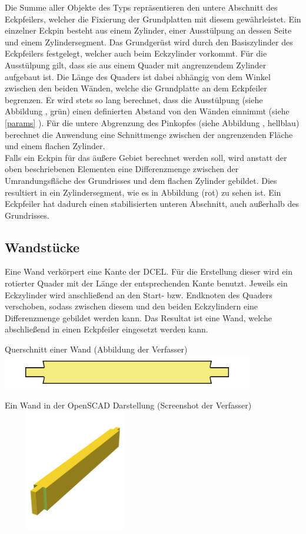 Die Summe aller Objekte des Typs  repräsentieren den untere Abschnitt des Eckpfeilers, welcher die Fixierung der Grundplatten mit diesem gewährleistet.
Ein einzelner Eckpin besteht aus einem Zylinder, einer Ausstülpung an dessen Seite und einem Zylindersegment.
Das Grundgerüst wird durch den Basiszylinder des Eckpfeilers festgelegt, welcher auch beim Eckzylinder vorkommt.
Für die Ausstülpung gilt, dass sie aus einem Quader mit angrenzendem Zylinder aufgebaut ist.
Die Länge des Quaders ist dabei abhängig von dem Winkel zwischen den beiden Wänden, welche die Grundplatte an dem Eckpfeiler begrenzen.
Er wird stets so lang berechnet, dass die Ausstülpung (siehe Abbildung \thebildnr, grün) einen definierten Abstand von den Wänden einnimmt (siehe \ref{params} ).
Für die untere Abgrenzung des Pinkopfes (siehe Abbildung \thebildnr, hellblau) berechnet die Anwendung eine Schnittmenge zwischen der angrenzenden Fläche und einem flachen Zylinder.\\
Falls ein Eckpin für das äußere Gebiet berechnet werden soll, wird anstatt der oben beschriebenen Elementen eine Differenzmenge zwischen der Umrandungsfläche des Grundrisses und dem flachen Zylinder gebildet.
Dies resultiert in ein Zylindersegment, wie es in Abbildung \thebildnr (rot) zu sehen ist.
Ein Eckpfeiler hat dadurch einen stabilisierten unteren Abschnitt, auch außerhalb des Grundrisses.


\subsection{Wandstücke}
Eine Wand verkörpert eine Kante der DCEL.
Für die Erstellung dieser wird ein rotierter Quader mit der Länge der entsprechenden Kante benutzt.
Jeweils ein Eckzylinder wird anschließend an den Start- bzw. Endknoten des Quaders verschoben, sodass zwischen diesem und den beiden Eckzylindern eine Differenzmenge gebildet werden kann.
Das Resultat ist eine Wand, welche abschließend in einen Eckpfeiler eingesetzt werden kann. 

\begin{Bild}{Querschnitt einer Wand (Abbildung der Verfasser)}
	\includegraphics[width = 110mm]{Bilder/Wand2D-04}
\end{Bild}

\begin{Bild}{Ein Wand in der OpenSCAD Darstellung (Screenshot der Verfasser)}
	\includegraphics[height=200px, width=240px]{Bilder/Untereinheit_Wand}
\end{Bild}

